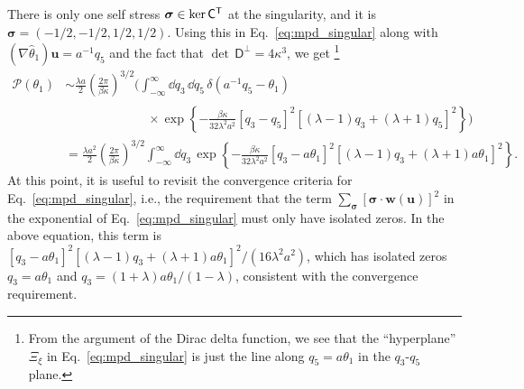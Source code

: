 %
There is only one self stress $\bm{\sigma}\in \ker\mathsf{C}^\mathsf{T}$ at the singularity, and it is $\bm{\sigma} = \left(-1/2, -1/2, 1/2, 1/2\right)$.
Using this in Eq.~\eqref{eq:mpd_singular} along with $(\nabla\hat{\theta}_{1})\bm{u} = a^{-1}q_{5}$ and the fact that $\det\,\mathsf{D}^\perp = 4\kappa^3$, we get%
\footnote{From the argument of the Dirac delta function, we see that the ``hyperplane'' $\Xi_{\xi}$ in Eq.~\eqref{eq:mpd_singular} is just the line along $q_{5} = a\theta_{1}$ in the $q_{3}$-$q_{5}$ plane.}
%
\begin{equation}
  \begin{aligned}
    \mathscr{P}(\theta_1) %
                                           &\sim \frac{\lambda a}{2}\left(\frac{2\pi}{\beta\kappa}\right)^{3/2}\Biggl(\int_{-\infty}^{\infty} \dd{q}_3\, \dd{q}_{5}\, \delta(a^{-1}q_{5} - \theta_{1})\\
                                           &\phantom{\sim \frac{\lambda a}{2}\left(\frac{2\pi}{\beta\kappa}\right)^{3/2}}\quad\times\exp\left\{-\frac{\beta\kappa}{32\lambda^2a^2}\left[q_3 - q_5\right]^2\left[(\lambda-1)q_3 + (\lambda+1)q_5\right]^2\right\}\Biggr)\\
                                           &= \frac{\lambda a^2}{2}\left(\frac{2\pi}{\beta\kappa}\right)^{3/2}\int_{-\infty}^{\infty} \dd{q}_3\, \exp\left\{-\frac{\beta\kappa}{32\lambda^2a^2}\left[q_3 - a\theta_{1}\right]^2\left[(\lambda-1)q_3 + (\lambda+1)a\theta_{1}\right]^2\right\}.
  \end{aligned}
  \label{sm:eq:4bar_mpd_int}
\end{equation}
%
At this point, it is useful to revisit the convergence criteria for Eq.~\eqref{eq:mpd_singular}, i.e., the requirement that the term $\sum_{\bm{\sigma}} [\bm{\sigma}\cdot \bm{w}(\bm{u})]^{2}$ in the exponential of Eq.~\eqref{eq:mpd_singular} must only have isolated zeros. In the above equation, this term is $[q_3 - a\theta_{1}]^{2}[(\lambda-1)q_3 + (\lambda+1)a\theta_{1}]^{2}/(16\lambda^{2}a^{2})$, which has isolated zeros $q_{3} = a\theta_{1}$ and $q_{3} = (1+\lambda)a\theta_{1}/(1-\lambda)$, consistent with the convergence requirement.

